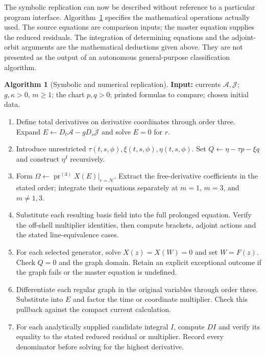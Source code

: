 \documentclass[11pt]{article}
\theoremstyle{definition}
\newtheorem{algorithm}{Algorithm}[section]
\newcommand{\pr}{\operatorname{pr}}
\begin{document}
The symbolic replication can now be described without reference to a
particular program interface. Algorithm~\ref{alg:sve-symbolic} specifies
the mathematical operations actually used. The source equations are
comparison inputs; the master equation supplies the reduced residuals.
The integration of determining equations and the adjoint-orbit arguments
are the mathematical deductions given above. They are not presented as
the output of an autonomous general-purpose classification algorithm.
\par\noindent\begin{minipage}{\linewidth}
\begin{algorithm}[Symbolic and numerical replication]
\label{alg:sve-symbolic}
\normalfont\small
\textbf{Input:} currents $\mathcal A,\mathcal J$; $g,\kappa>0$, $m\geq1$;
the chart $p,q>0$; printed formulas to compare; chosen initial data.
\begin{enumerate}
\item Define total derivatives on derivative coordinates through order three.
      Expand $E\gets D_t\mathcal A-gD_s\mathcal J$ and solve $E=0$ for $r$.
\item Introduce unrestricted $\tau(t,s,\phi),\xi(t,s,\phi),\eta(t,s,\phi)$.
      Set $Q\gets\eta-\tau p-\xi q$ and construct $\eta^I$ recursively.
\item Form $\Omega\gets\pr^{(3)}X(E)|_{r=\mathcal N}$.
      Extract the free-derivative coefficients in the stated order;
      integrate their equations separately at $m=1$, $m=3$, and $m\ne1,3$.
\item Substitute each resulting basis field into the full prolonged equation.
      Verify the off-shell multiplier identities, then compute brackets,
      adjoint actions and the stated line-equivalence cases.
\item For each selected generator, solve $X(z)=X(W)=0$ and set $W=F(z)$.
      Check $Q=0$ and the graph domain. Retain an explicit exceptional outcome
      if the graph fails or the master equation is undefined.
\item Differentiate each regular graph in the original variables through
      order three. Substitute into $E$ and factor the time or coordinate
      multiplier. Check this pullback against the compact current calculation.
\item For each analytically supplied candidate integral $I$, compute $DI$ and
      verify its equality to the stated reduced residual or multiplier.
      Record every denominator before solving for the highest derivative.

\end{enumerate}
\end{algorithm}
\end{minipage}
\end{document}
